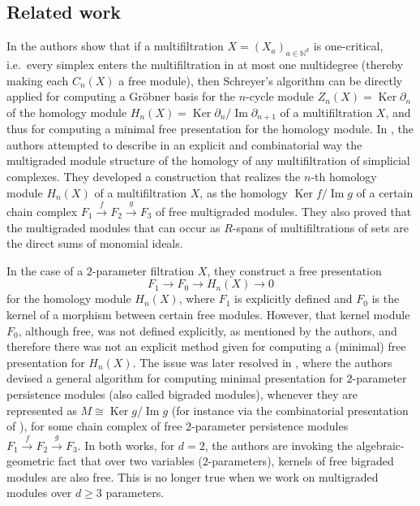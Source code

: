 \documentclass[oneside]{amsart}
\theoremstyle{definition}
\DeclareMathOperator\Ker{Ker}
\begin{document}
\subsection{Related work}
In \cite{CarlssonSinghZomorodian2010} the authors show that if a multifiltration $X = (X_a)_{a \in \mathbb N^d}$ is one-critical, i.e.~every simplex enters the multifiltration in at most one multidegree (thereby making each $C_n(X)$ a free module), then Schreyer's algorithm \cite{CoxLittleOShea2005} can be directly applied for computing a Gröbner basis for the $n$-cycle module $Z_n(X)=\Ker \partial_n$ of the homology module $H_n(X)=\Ker \partial_n / \operatorname{Im}\partial_{n+1}$ of a multifiltration $X$, and thus for computing a minimal free presentation for the homology module.
In \cite{ChachólskiScolamieroVaccarino2017}, the authors attempted to describe in an explicit and combinatorial way the multigraded module structure of the homology of any multifiltration of simplicial complexes.
They developed a construction that realizes the $n$-th homology module $H_n(X)$ of a multifiltration $X$, as the homology  $\Ker f/\operatorname{Im} g$ of a certain chain complex  $F_1\xrightarrow{f}F_2\xrightarrow{g}F_3$ of free multigraded modules.
They also proved that the multigraded modules that can occur as $R$-spans of multifiltrations of sets are the direct sums of monomial ideals. 

In the case of a $2$-parameter filtration $X$, they  construct a free presentation 
\[ F_1\to F_0\to H_n(X)\to 0 \]
for the homology module $H_n(X)$, where $F_1$ is explicitly defined and $F_0$ is the kernel of a  morphism between certain free modules.
However, that kernel module $F_0$, although free, was not defined explicitly, as mentioned by the authors, and therefore there was not an explicit method given for computing a (minimal) free presentation for $H_n(X)$.
The issue was later resolved in \cite{LesnickWright2022}, where the authors devised a general algorithm for computing minimal presentation for $2$-parameter persistence modules (also called bigraded modules), whenever they are represented as $M\cong \Ker g/\operatorname{Im} g$ (for instance via the combinatorial presentation of \cite{ChachólskiScolamieroVaccarino2017}), for some chain complex of free $2$-parameter persistence modules $F_1\xrightarrow{f}F_2\xrightarrow{g}F_3$.
In both works, for $d=2$, the authors are invoking the algebraic-geometric fact that over two variables ($2$-parameters), kernels of free bigraded modules are also free.
This is no longer true when we work on multigraded modules over $d\geq3$ parameters.
\end{document}
